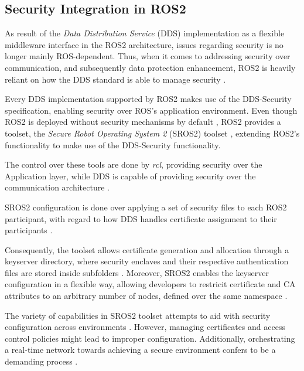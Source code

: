 \subsection{Security Integration in ROS2}

As result of the \textit{Data Distribution Service} (DDS) implementation as a flexible middleware interface in the ROS2 architecture, issues regarding security is no longer mainly ROS-dependent. Thus, when it comes to addressing security over communication, and subsequently data protection enhancement, ROS2 is heavily reliant on how the DDS standard is able to manage security \cite{kim2018security, 8794451}.

Every DDS implementation supported by ROS2 makes use of the DDS-Security specification, enabling security over ROS's application environment. Even though ROS2 is deployed without security mechanisms by default \cite{ros-dds-integration}, ROS2 provides a toolset, the \textit{Secure Robot Operating System 2} (SROS2) toolset \cite{sros2-gh}, extending ROS2's functionality to make use of the DDS-Security functionality. 

The control over these tools are done by \textit{rcl}, providing security over the Application layer, while DDS is capable of providing security over the communication architecture \cite{kim2018security}. 

SROS2 configuration is done over applying a set of security files to each ROS2 participant, with regard to how DDS handles certificate assignment to their participants \cite{white2016sros}. 

Consequently, the toolset allows certificate generation and allocation through a keyserver directory, where security enclaves and their respective authentication files are stored inside subfolders \cite{white2016sros, ros-dds-integration}. Moreover, SROS2 enables the keyserver configuration in a flexible way, allowing developers to restricit certificate and CA attributes to an arbitrary number of nodes, defined over the same namespace \cite{white2016sros}.

The variety of capabilities in SROS2 toolset attempts to aid with security configuration across environments \cite{ros-dds-integration}. However, managing certificates and access control policies might lead to improper configuration. Additionally, orchestrating a real-time network towards achieving a secure environment confers to be a demanding process \cite{ros-dds-integration, white2019network}.


